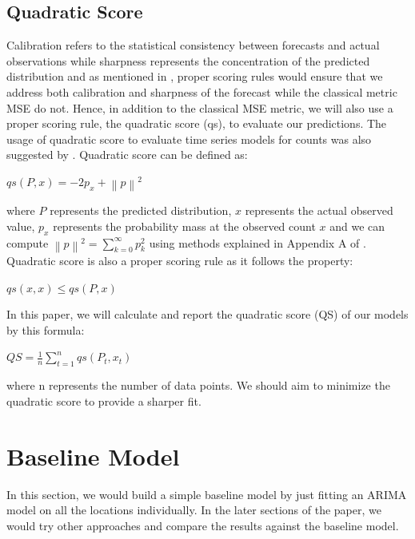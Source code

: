 \documentclass[nonblindrev,msom]{informs3} %
\begin{document}
\subsection{Quadratic Score}
\noindent Calibration refers to the statistical consistency between forecasts and actual observations while sharpness represents the concentration of the predicted distribution and as mentioned in \cite{Czado2009PredictiveMA}, proper scoring rules would ensure that we address both calibration and sharpness of the forecast while the classical metric MSE do not. Hence, in addition to the classical MSE metric, we will also use a proper scoring rule, the quadratic score (qs), to evaluate our predictions. The usage of quadratic score to evaluate time series models for counts was also suggested by \cite{jstor}. Quadratic score can be defined as: 

\begin{center}
    $\displaystyle qs(P, x) = -2p_{x} + \left \| p \right \|^{2}$
\end{center} 

\noindent where $P$ represents the predicted distribution, $x$ represents the actual observed value, $p_x$ represents the probability mass at the observed count $x$ and we can compute $\left \| p \right \|^{2} = \sum_{k=0}^{\infty }p_{k}^{2}$ using methods explained in Appendix A of \cite{Czado2009PredictiveMA}. Quadratic score is also a proper scoring rule as it follows the property: \\

\begin{center}
    $\displaystyle qs(x, x) \leq qs(P, x)$
\end{center} 

\noindent In this paper, we will calculate and report the quadratic score (QS) of our models by this formula: \\

\begin{center}
    $\displaystyle QS=\frac{1}{n}\sum_{t=1}^{n}qs(P_t,x_t)$
\end{center} 


\noindent where n represents the number of data points. We should aim to minimize the quadratic score to provide a sharper fit.

\newpage
\section{Baseline Model}
In this section, we would build a simple baseline model by just fitting an ARIMA model on all the locations individually. In the later sections of the paper, we would try other approaches and compare the results against the baseline model. 
\end{document}
